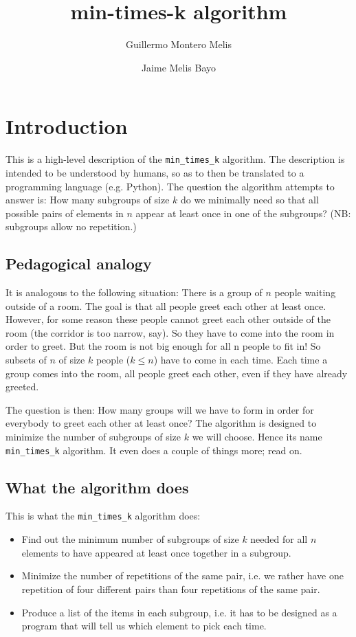 \documentclass[a4paper]{article}
\title{min-times-k algorithm}
\author{Guillermo Montero Melis \and Jaime Melis Bayo}
\begin{document}
\maketitle

\section{Introduction}

This is a high-level description of the \verb:min_times_k: algorithm.
The description is intended to be understood by humans, so as to then be translated to a programming language (e.g. Python).
The question the algorithm attempts to answer is:
How many subgroups of size $k$ do we minimally need so that all possible pairs of elements in $n$ appear at least once in one of the subgroups? (NB: subgroups allow no repetition.)

\subsection{Pedagogical analogy}
\label{ssec:pedag}

It is analogous to the following situation:
There is a group of $n$ people waiting outside of a room.
The goal is that all people greet each other at least once.
However, for some reason these people cannot greet each other outside of the room (the corridor is too narrow, say). So they have to come into the room in order to greet.
But the room is not big enough for all n people to fit in! So subsets of $n$ of size $k$ people ($k \leq n$) have to come in each time.
Each time a group comes into the room, all people greet each other, even if they have already greeted.

The question is then: How many groups will we have to form in order for everybody to greet each other at least once?
The algorithm is designed to minimize the number of subgroups of size $k$ we will choose.
Hence its name \verb:min_times_k: algorithm.
It even does a couple of things more; read on.

\subsection{What the algorithm does}

This is what the \verb:min_times_k: algorithm does:

\begin{itemize}
\item Find out the minimum number of subgroups of size $k$ needed for all $n$ elements to have appeared at least once together in a subgroup.
\item Minimize the number of repetitions of the same pair, i.e. we rather have one repetition of four different pairs than four repetitions of the same pair.
\item Produce a list of the items in each subgroup, i.e. it has to be designed as a program that will tell us which element to pick each time.
\end{itemize}
\end{document}
